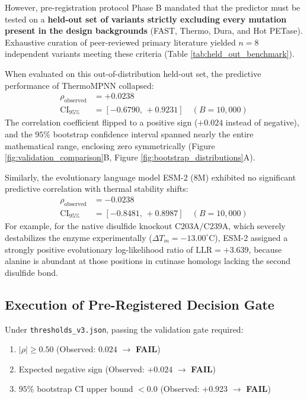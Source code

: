 \documentclass[10pt,twocolumn]{article}
\begin{document}
However, pre-registration protocol Phase B mandated that the predictor must be tested on a \textbf{held-out set of variants strictly excluding every mutation present in the design backgrounds} (FAST, Thermo, Dura, and Hot PETase). Exhaustive curation of peer-reviewed primary literature yielded $n = 8$ independent variants meeting these criteria (Table \ref{tab:held_out_benchmark}). 

When evaluated on this out-of-distribution held-out set, the predictive performance of ThermoMPNN collapsed:
\begin{align}
    \rho_{\text{observed}} &= +0.0238 \\
    \text{CI}_{95\%} &= [-0.6790, \, +0.9231] \quad (B = 10,000)
\end{align}
The correlation coefficient flipped to a positive sign ($+0.024$ instead of negative), and the $95\%$ bootstrap confidence interval spanned nearly the entire mathematical range, enclosing zero symmetrically (Figure \ref{fig:validation_comparison}B, Figure \ref{fig:bootstrap_distributions}A).

Similarly, the evolutionary language model ESM-2 (8M) exhibited no significant predictive correlation with thermal stability shifts:
\begin{align}
    \rho_{\text{observed}} &= -0.0238 \\
    \text{CI}_{95\%} &= [-0.8481, \, +0.8987] \quad (B = 10,000)
\end{align}
For example, for the native disulfide knockout $\text{C203A/C239A}$, which severely destabilizes the enzyme experimentally ($\Delta T_m = -13.00^\circ\text{C}$), ESM-2 assigned a strongly positive evolutionary log-likelihood ratio of $\text{LLR} = +3.639$, because alanine is abundant at those positions in cutinase homologs lacking the second disulfide bond.

\subsection{Execution of Pre-Registered Decision Gate}
Under \texttt{thresholds\_v3.json}, passing the validation gate required:
\begin{enumerate}
    \item $|\rho| \geq 0.50$ (Observed: $0.024$ $\rightarrow$ \textbf{FAIL})
    \item Expected negative sign (Observed: $+0.024$ $\rightarrow$ \textbf{FAIL})
    \item $95\%$ bootstrap CI upper bound $< 0.0$ (Observed: $+0.923$ $\rightarrow$ \textbf{FAIL})
\end{enumerate}
\end{document}
